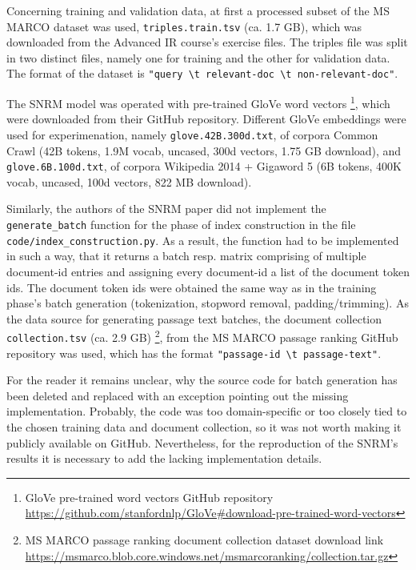 Concerning training and validation data, at first a processed subset of the MS MARCO dataset was used, 
    \verb|triples.train.tsv| (ca. 1.7 GB), which was downloaded from the Advanced IR course's exercise files.
The triples file was split in two distinct files, namely one for training and the other for validation data.
The format of the dataset is \verb|"query \t relevant-doc \t non-relevant-doc"|.

The SNRM model was operated with pre-trained GloVe word vectors
    \footnote{GloVe pre-trained word vectors GitHub repository \url{https://github.com/stanfordnlp/GloVe\#download-pre-trained-word-vectors}},
    which were downloaded from their GitHub repository.
Different GloVe embeddings were used for experimenation, namely \verb|glove.42B.300d.txt|, 
    of corpora Common Crawl (42B tokens, 1.9M vocab, uncased, 300d vectors, 1.75 GB download), 
    and \verb|glove.6B.100d.txt|, of corpora Wikipedia 2014 + Gigaword 5 (6B tokens, 400K vocab, uncased, 100d vectors, 822 MB download).

Similarly, the authors of the SNRM paper did not implement the \verb|generate_batch| function for the phase of index construction in 
    the file \verb|code/index_construction.py|. As a result, the function had to be implemented in such a way, that it returns a
    batch resp. matrix comprising of multiple document-id entries and assigning every document-id a list of the document token ids.
    The document token ids were obtained the same way as in the training phase's batch generation 
    (tokenization, stopword removal, padding/trimming).
As the data source for generating passage text batches, the document collection \verb|collection.tsv| (ca. 2.9 GB)
    \footnote{MS MARCO passage ranking document collection dataset download link 
    \url{https://msmarco.blob.core.windows.net/msmarcoranking/collection.tar.gz}}, 
    from the MS MARCO passage ranking GitHub repository was used, which has the format \verb|"passage-id \t passage-text"|.

For the reader it remains unclear, why the source code for batch generation has been deleted and replaced with an exception 
    pointing out the missing implementation. 
Probably, the code was too domain-specific or too closely tied to the chosen training data and document collection,
    so it was not worth making it publicly available on GitHub.
Nevertheless, for the reproduction of the SNRM's results it is necessary to add the lacking implementation details.

